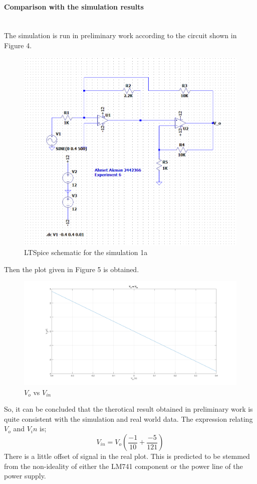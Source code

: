 \documentclass[letterpaper,12pt]{article}
\begin{document}
\paragraph{Comparison with the simulation results}
 \mbox{}
\\
The simulation is run in preliminary work according to the circuit shown in Figure 4.
\begin{figure}[H]
	\centering
   \includegraphics[width=1\textwidth]{Pre1.png}
   \caption{LTSpice schematic for the simulation 1a }
\end{figure}
Then the plot given in Figure 5 is obtained.
\begin{figure}[H]
	\centering
   \includegraphics[width=1\textwidth]{Pre_1a.png}
   \caption{\(V_{o}\) vs \(V_{in}\)}
\end{figure}
So, it can be concluded that the therotical result obtained in preliminary work is quite consistent with the simulation and real world data. The expression relating \(V_o\) and \(V_in\) is;
\[V_{in} = V_o(\frac{-1}{10} + \frac{-5}{121})\]
There is a little offset of signal in the real plot. This is predicted to be stemmed from the non-ideality of either the LM741 component or the power line of the power supply.
\end{document}
